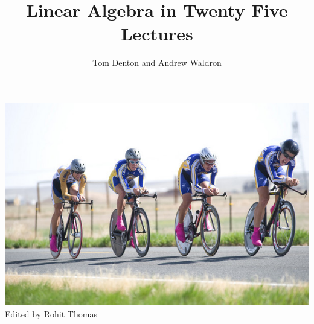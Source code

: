 \documentclass[12pt]{article}
\newcommand{\1}{{\rm 1\hspace*{-0.4ex}%
\rule{0.1ex}{1.52ex}\hspace*{0.2ex}}}
\begin{document}
\title{Linear Algebra in Twenty Five Lectures}

\author{Tom Denton and Andrew Waldron}


\maketitle

\begin{center}
\includegraphics[scale=.6]{bikes.jpg}\\[8mm]
 {Edited by Rohit Thomas}
\end{center}

\newpage

\tableofcontents


\newpage






































\end{document}
